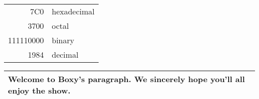 \documentclass{article}
\begin{document}
\begin{tabular}{|r|l|} %
\hline
7C0 & hexadecimal \\
3700 & octal \\ \cline{2-2}
111110000 & binary \\
\hline

\hline
1984 & decimal \\
\hline


\hline
\end{tabular}
\newline

\begin{tabular}{|p{4.7cm}|}
\hline
Welcome to Boxy’s paragraph.
We sincerely hope you’ll
all enjoy the show.\\
\hline
\end{tabular}
\end{document}
